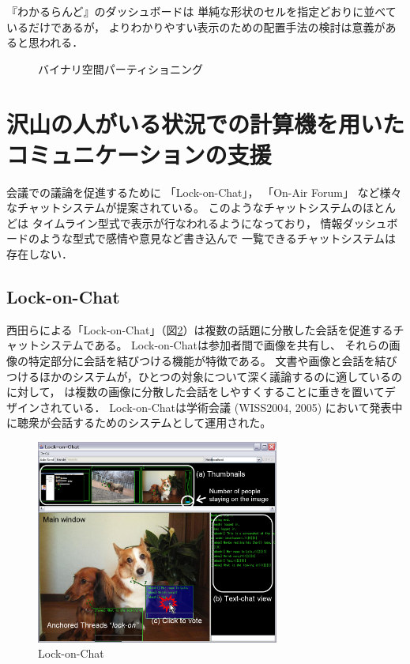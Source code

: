 『わかるらんど』のダッシュボードは
単純な形状のセルを指定どおりに並べているだけであるが，
よりわかりやすい表示のための配置手法の検討は意義があると思われる．

\begin{figure}[H]
\centering
{}
\caption{バイナリ空間パーティショニング}
\label{hertzog}
\end{figure}


\section{沢山の人がいる状況での計算機を用いたコミュニケーションの支援}
会議での議論を促進するために
「Lock-on-Chat」\cite{nishida2006}，
「On-Air Forum」\cite{nishida2011}
など様々なチャットシステムが提案されている。
このようなチャットシステムのほとんどは
タイムライン型式で表示が行なわれるようになっており，
情報ダッシュボードのような型式で感情や意見など書き込んで
一覧できるチャットシステムは存在しない．


\subsection{Lock-on-Chat}

西田らによる「Lock-on-Chat\cite{nishida2006}」（図\ref{lockonchat}）は複数の話題に分散した会話を促進するチャットシステムである。
Lock-on-Chatは参加者間で画像を共有し、
それらの画像の特定部分に会話を結びつける機能が特徴である。
文書や画像と会話を結びつけるほかのシステムが，ひとつの対象について深く議論するのに適しているのに対して，
は複数の画像に分散した会話をしやすくすることに重きを置いてデザインされている．
Lock-on-Chatは学術会議 (WISS2004, 2005) において発表中に聴衆が会話するためのシステムとして運用された。

\begin{figure}[H]
\centering
\includegraphics[width=8cm]{images/lockonchat.png}
\caption{Lock-on-Chat}
\label{lockonchat}
\end{figure}


